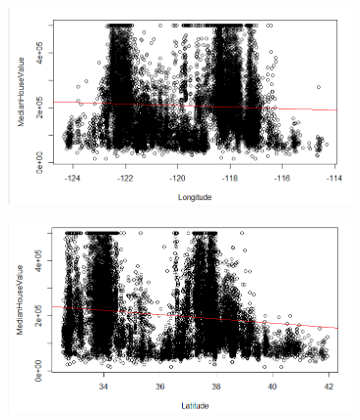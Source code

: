 \begin{figure}[!tbh]
	\centering
	\begin{subfigure}{0.5\textwidth}
	\includegraphics[width=1\linewidth]{figures/regre_1}
\caption{}
\label{fig:regre1}
	\end{subfigure}\hfil %
	\begin{subfigure}{0.5\textwidth}
	\includegraphics[width=1\linewidth]{figures/regre_2}
\caption{}
\label{fig:regre2}
	\end{subfigure}\hfil %
	
	\medskip
	

\end{figure}
